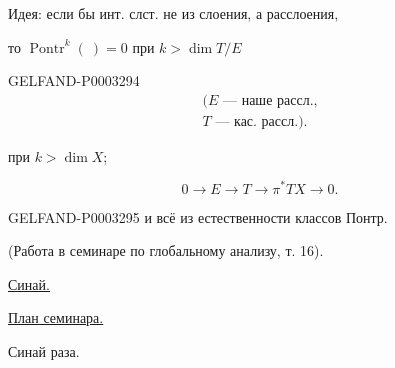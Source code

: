 Идея: если бы инт. слст. не из слоения, а расслоения,

то $\operatorname{Pontr}^k(\ )=0$ при $k>\dim T/E$

\begin{GelfandAdjacentEvidence}{GELFAND-P000329}{4}
\begin{gather*}(E\text{ --- наше рассл.,}\\ T\text{ --- кас. рассл.}).\end{gather*}





\end{GelfandAdjacentEvidence}


при $k>\dim X$;

\begin{equation*}0\longrightarrow E\longrightarrow T\longrightarrow\pi^*TX\longrightarrow0.\end{equation*}

\begin{GelfandAdjacentEvidence}{GELFAND-P000329}{5}
и всё из естественности классов Понтр.

\end{GelfandAdjacentEvidence}


(Работа в семинаре по глобальному анализу, т. 16).

\uline{Синай.}

\uline{План семинара.}

Синай раза.





